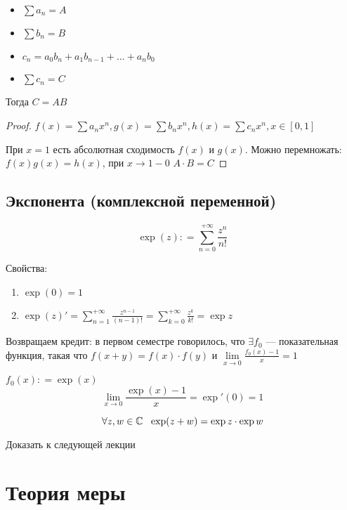 \begin{corollary}[т. Абеля]\itemfix
    \begin{itemize}
        \item \(\sum a_n = A\)
        \item \(\sum b_n = B\)
        \item \(c_n = a_0b_n + a_1 b_{n - 1} + \dots + a_n b_0\)
        \item \(\sum c_n = C\)
    \end{itemize}
    Тогда \(C = AB\)
\end{corollary}
\begin{proof}
    \(f(x) = \sum a_n x^n, g(x) = \sum b_n x^n, h(x) = \sum c_nx^n, x\in[0, 1]\)

    При \(x = 1\) есть абсолютная сходимость \(f(x)\) и \(g(x)\). Можно перемножать: \(f(x)g(x) = h(x)\), при \(x\to 1 - 0\) \(A\cdot B = C\)
\end{proof}

\subsection*{Экспонента (комплексной переменной)}

\begin{definition}
    \[\exp(z) : = \sum_{n = 0}^{ +\infty} \frac{z^n}{n!} \]
\end{definition}

Свойства:
\begin{enumerate}
    \item \(\exp(0) = 1\)
    \item \(\exp(z)' = \sum\limits_{n = 1}^{ +\infty} \frac{z^{n - 1}}{(n - 1)!} = \sum\limits_{k = 0}^{ +\infty} \frac{z^{k}}{k!} = \exp z\)
\end{enumerate}

Возвращаем кредит: в первом семестре говорилось, что \(\exists f_0\) --- показательная функция, такая что \(f(x + y) = f(x)\cdot f(y)\) и \(\lim\limits_{x\to 0} \frac{f_0(x) - 1}{x} = 1\)

\(f_0(x) : = \exp(x)\)
\[\lim_{x\to 0} \frac{\exp(x) - 1}{x} = \exp'(0) = 1\]

\begin{theorem}
    \[\forall z, w\in \mathbb{C} \ \ \exp(z + w) = \exp z \cdot \exp w\]
\end{theorem}
\begin{exercise}
    Доказать к следующей лекции
\end{exercise}

\section*{Теория меры}

